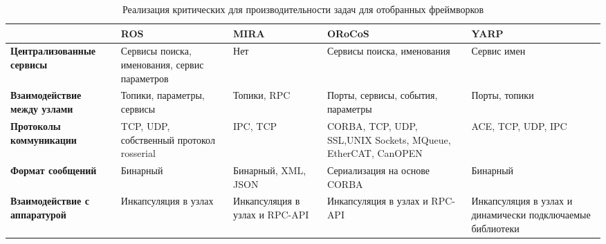 \begin{table}[!h]
	\centering
	\small
	\def\arraystretch{1.3}
	\caption{Реализация критических для производительности задач для отобранных фреймворков}
	\label{table:chapter2:performance_factors_solutions}
	\begin{tabular}{|p{3.6cm}|p{2.7cm}|p{2.7cm}|p{2.7cm}|p{2.7cm}|}
		\hline
		& \textbf{ROS} & \textbf{MIRA} & \textbf{ORoCoS} & \textbf{YARP} \\ \hline
		\textbf{Централизованные сервисы} & Сервисы поиска, именования, сервис параметров & Нет & Сервисы поиска, именования & Сервис имен \\ \hline
		\textbf{Взаимодействие между узлами} & Топики, параметры, сервисы & Топики, RPC & Порты, сервисы, события, параметры & Порты, топики \\ \hline
		\textbf{Протоколы коммуникации} & TCP, UDP, собственный протокол rosserial & IPC, TCP & CORBA, TCP, UDP, SSL,UNIX Sockets, MQueue, EtherCAT, CanOPEN & ACE, TCP, UDP, IPC \\ \hline
		\textbf{Формат сообщений} & Бинарный & Бинарный, XML, JSON & Сериализация на основе CORBA & Бинарный \\ \hline
		\textbf{Взаимодействие с аппаратурой} & Инкапсуляция в узлах & Инкапсуляция в узлах и RPC-API & Инкапсуляция в узлах и RPC-API & Инкапсуляция в узлах и динамически подключаемые библиотеки \\ \hline
	\end{tabular}
\end{table}